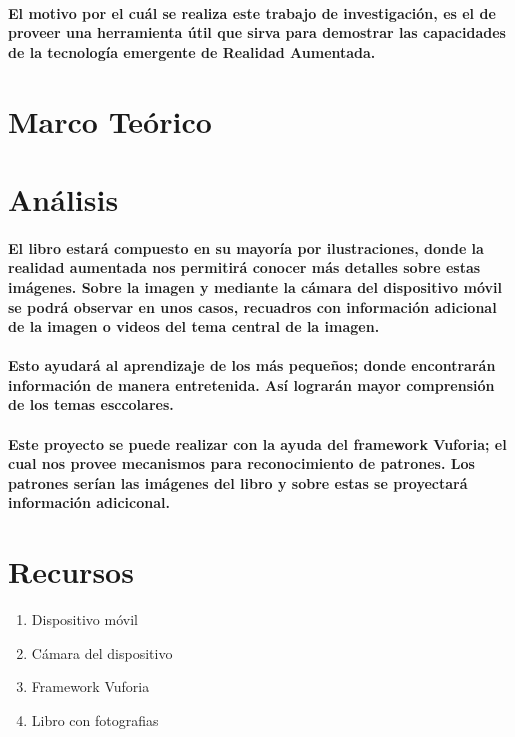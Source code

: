 \documentclass[11pt]{article} %
\begin{document}
\paragraph{
El motivo por el cuál se realiza este trabajo de investigación, es el de proveer una herramienta útil que sirva para demostrar las capacidades de la tecnología emergente de Realidad Aumentada.
 }
\section{Marco Teórico}


\section{Análisis}
\paragraph{
El libro estará compuesto en su mayoría por ilustraciones, donde la realidad aumentada nos permitirá conocer más detalles sobre estas imágenes.  Sobre la imagen y mediante la cámara del dispositivo móvil se podrá observar en unos casos, recuadros con información adicional de la imagen o videos del tema central de la imagen.
 }
\paragraph{
Esto ayudará al aprendizaje de los más pequeños; donde encontrarán información de manera entretenida.  Así lograrán mayor comprensión de los temas esccolares.
 }
\paragraph{
Este proyecto se puede realizar con la ayuda del framework Vuforia; el cual nos provee mecanismos para reconocimiento de patrones.  Los patrones serían las imágenes del libro y sobre estas se proyectará información adiciconal.
 }

\section{Recursos}
\begin{enumerate} 
	 \item Dispositivo móvil
	 \item Cámara del dispositivo
	 \item Framework Vuforia
	 \item Libro con fotografias
 \end{enumerate}
\end{document}

